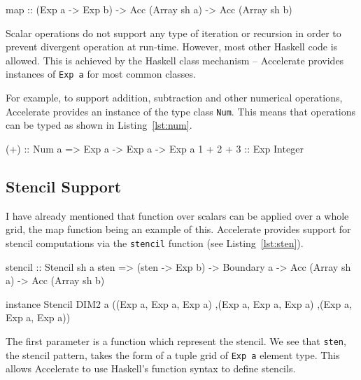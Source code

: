 \documentclass[12pt,a4paper,oneside]{scrbook}
\begin{document}
\begin{hflisting}[label={lst:map}, caption=The type of the \texttt{map}
  operation as defined by Accelerate.]
map :: (Exp a -> Exp b) -> Acc (Array sh a)
       -> Acc (Array sh b)
\end{hflisting}

Scalar operations do not support any type of iteration or recursion in order to
prevent divergent operation at run-time. However, most other Haskell code is
allowed. This is achieved by the Haskell class mechanism -- Accelerate provides
instances of \texttt{Exp a} for most common classes.

For example, to support addition, subtraction and other numerical operations,
Accelerate provides an instance of the type class \texttt{Num}. This means that
operations can be typed as shown in Listing~\ref{lst:num}.

\begin{hflisting}[label={lst:num}, caption=The type of addition overloaded by Accelerate.]
(+) :: Num a => Exp a -> Exp a -> Exp a
1 + 2 + 3 :: Exp Integer
\end{hflisting}

\subsection{Stencil Support}

I have already mentioned that function over scalars can be applied over
a whole grid, the map function being an example of this. Accelerate
provides support for stencil computations via the \texttt{stencil}
function (see Listing~\ref{lst:sten}).

\begin{hflisting}[label={lst:sten}, caption={The type of the stencil application
  function in Accelerate. I have also included an example instance of the
  \texttt{Stencil} type class. Many others are also possible.}]
stencil :: Stencil sh a sten =>
           (sten -> Exp b) ->
           Boundary a ->
           Acc (Array sh a) ->
           Acc (Array sh b)

instance Stencil DIM2 a ((Exp a, Exp a, Exp a)
                        ,(Exp a, Exp a, Exp a)
                        ,(Exp a, Exp a, Exp a))
\end{hflisting}

The first parameter is a function which represent the stencil. We see
that \texttt{sten}, the stencil pattern, takes the form of a tuple grid
of \texttt{Exp a} element type. This allows Accelerate to use Haskell's
function syntax to define stencils.
\end{document}
